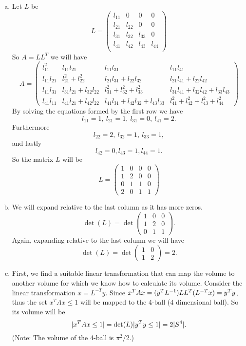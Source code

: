 \begin{solution}
	\begin{enumerate}[(a)]
		\item Let $ L $ be
		\[ L = \begin{pmatrix}
			l_{11} & 0 & 0 & 0 \\
			l_{21} & l_{22} & 0 & 0 \\
			l_{31} & l_{32} & l_{33} & 0 \\
			l_{41} & l_{42} & l_{43} & l_{44} \\
		\end{pmatrix} \]
		So $ A = LL^T $ we will have
		\[ A = \begin{pmatrix}
			l_{11}^2 & l_{11}l_{21} & l_{11}l_{31} & l_{11}l_{41} \\
			l_{11}l_{21} & l_{21}^2 + l_{22}^2 & l_{21}l_{31} + l_{22}l_{32} & l_{21}l_{41} + l_{22}l_{42} \\
			l_{11}l_{31} & l_{31}l_{21} + l_{32}l_{22} & l_{31}^2 + l_{32}^2 + l_{33}^2 & l_{31}l_{41} + l_{32}l_{42} + l_{33}l_{43} \\
			l_{41}l_{11} & l_{41}l_{21} + l_{42}l_{22} & l_{41}l_{31} + l_{42}l_{32} + l_{43}l_{33} & l_{41}^2 + l_{42}^2 + l_{43}^2 + l_{44}^2
		\end{pmatrix}  \]
		By solving the equations formed by the first row we have
		\[ l_{11} = 1,\ l_{21} = 1,\ l_{31}=0,\ l_{41} = 2. \]
		Furthermore
		\[ l_{22} = 2,\ l_{32} = 1,\ l_{33}=1, \]
		and lastly
		\[ l_{42} = 0, l_{43} = 1, l_{44} = 1. \]
		So the matrix $ L $ will be
		\[ L = \begin{pmatrix}
			1 & 0 & 0 & 0 \\
			1 & 2 & 0 & 0 \\
			0 & 1 & 1 & 0 \\
			2 & 0 & 1 & 1
		\end{pmatrix} \]
		
		\item We will expand relative to the last column as it has more zeros.
		\[ \det(L) = \det\begin{pmatrix}
			1 & 0 & 0 \\
			1 & 2 & 0 \\
			0 & 1 & 1 
		\end{pmatrix}. \]
		Again, expanding relative to the last column we will have
		\[ \det(L) = \det\begin{pmatrix}
			1 & 0 \\
			1 & 2
		\end{pmatrix} = 2. \]
		
		\item First, we find a suitable linear transformation that can map the volume to another volume for which we know how to calculate its volume. Consider the linear transformation $ x = L^{-T}  y $. Since $ x^T A x = (y^T L^{-1}) L L^T (L^{-T}x) = y^T y $, thus the set $ x^T A x \leq 1  $ will be mapped to the 4-ball (4 dimensional ball). So its volume will be
		\[ |x^T A x \leq 1| = \det(L) |y^T y \leq 1| = 2 |S^4|. \]
		(Note: The volume of the 4-ball is $ \pi^2/2 $.)
	\end{enumerate}
\end{solution}



